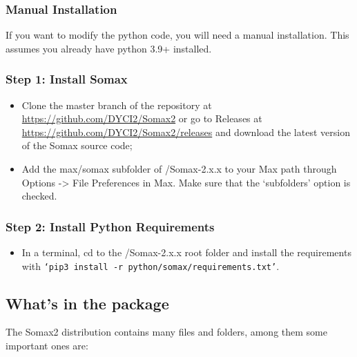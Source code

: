 \subsubsection{Manual Installation}

If you want to modify the python code, you will need a manual installation. This assumes you already have python 3.9+ installed.

\subsubsection{Step 1: Install Somax}

\begin{itemize}
    \item Clone the master branch of the repository at \url{https://github.com/DYCI2/Somax2} or go to Releases at \url{https://github.com/DYCI2/Somax2/releases} and download the latest version of the Somax source code;
    \item Add the max/somax subfolder of /Somax-2.x.x to your Max path through Options -> File Preferences in Max. Make sure that the `subfolders' option is checked.
\end{itemize}

\subsubsection{Step 2: Install Python Requirements}

\begin{itemize}
    \item In a terminal, cd to the /Somax-2.x.x root folder and install the requirements with \texttt{`pip3 install -r python/somax/requirements.txt'}.
\end{itemize}



\subsection{What's in the package}

The Somax2 distribution contains many files and folders, among them some important ones are:

